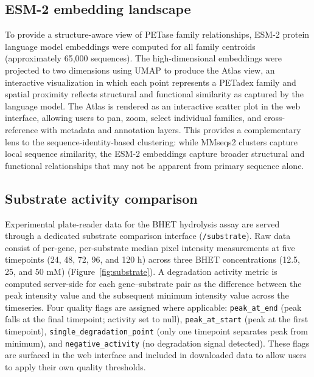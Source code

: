 \documentclass[unnumsec,webpdf,modern,large]{oup-authoring-template}
\begin{document}
\subsection{ESM-2 embedding landscape}

To provide a structure-aware view of PETase family relationships, ESM-2 protein language model embeddings \citep{lin_evolutionary-scale_2023} were computed for all family centroids (approximately 65,000 sequences). The high-dimensional embeddings were projected to two dimensions using UMAP \citep{mcinnes_umap_2020} to produce the Atlas view, an interactive visualization in which each point represents a PETadex family and spatial proximity reflects structural and functional similarity as captured by the language model. The Atlas is rendered as an interactive scatter plot in the web interface, allowing users to pan, zoom, select individual families, and cross-reference with metadata and annotation layers. This provides a complementary lens to the sequence-identity-based clustering: while MMseqs2 clusters capture local sequence similarity, the ESM-2 embeddings capture broader structural and functional relationships that may not be apparent from primary sequence alone.

\subsection{Substrate activity comparison}

Experimental plate-reader data for the BHET hydrolysis assay are served through a dedicated substrate comparison interface (\texttt{/substrate}). Raw data consist of per-gene, per-substrate median pixel intensity measurements at five timepoints (24, 48, 72, 96, and 120 h) across three BHET concentrations (12.5, 25, and 50 mM) (Figure~\ref{fig:substrate}). A degradation activity metric is computed server-side for each gene--substrate pair as the difference between the peak intensity value and the subsequent minimum intensity value across the timeseries. Four quality flags are assigned where applicable: \texttt{peak\_at\_end} (peak falls at the final timepoint; activity set to null), \texttt{peak\_at\_start} (peak at the first timepoint), \texttt{single\_degradation\_point} (only one timepoint separates peak from minimum), and \texttt{negative\_activity} (no degradation signal detected). These flags are surfaced in the web interface and included in downloaded data to allow users to apply their own quality thresholds.

\end{document}
